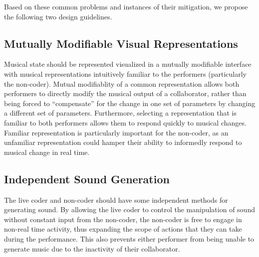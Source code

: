 \documentclass{nime-alternate}
\begin{document}
Based on these common problems and instances of their mitigation, we propose the following two design guidelines.

\subsection{Mutually Modifiable Visual Representations}
Musical state should be represented visualized in a mutually modifiable interface with musical representations intuitively familiar to the performers (particularly the non-coder). Mutual modifiablity of a common representation allows both performers to directly modify the musical output of a collaborator, rather than being forced to ``compensate'' for the change in one set of parameters by changing a different set of parameters. Furthermore, selecting a representation that is familiar to both performers allows them to respond quickly to musical changes. Familiar representation is particularly important for the non-coder, as an unfamiliar representation could hamper their ability to informedly respond to musical change in real time.

\vfill\null

\subsection{Independent Sound Generation}
The live coder and non-coder should have some independent methods for generating sound. By allowing the live coder to control the manipulation of sound without constant input from the non-coder, the non-coder is free to engage in non-real time activity, thus expanding the scope of actions that they can take during the performance. This also prevents either performer from being unable to generate music due to the inactivity of their collaborator.  


\end{document}
